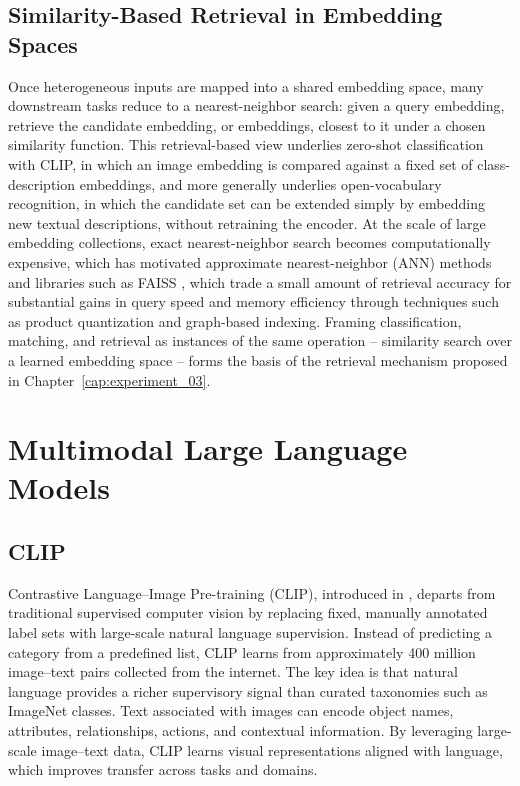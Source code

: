 \subsection{Similarity-Based Retrieval in Embedding Spaces}

Once heterogeneous inputs are mapped into a shared embedding space, many downstream tasks reduce to a nearest-neighbor search: given a query embedding, retrieve the candidate embedding, or embeddings, closest to it under a chosen similarity function. This retrieval-based view underlies zero-shot classification with CLIP, in which an image embedding is compared against a fixed set of class-description embeddings, and more generally underlies open-vocabulary recognition, in which the candidate set can be extended simply by embedding new textual descriptions, without retraining the encoder. At the scale of large embedding collections, exact nearest-neighbor search becomes computationally expensive, which has motivated approximate nearest-neighbor (ANN) methods and libraries such as FAISS \citep{johnson2019billion}, which trade a small amount of retrieval accuracy for substantial gains in query speed and memory efficiency through techniques such as product quantization and graph-based indexing. Framing classification, matching, and retrieval as instances of the same operation -- similarity search over a learned embedding space -- forms the basis of the retrieval mechanism proposed in Chapter~\ref{cap:experiment_03}.

\section{Multimodal Large Language Models}
\subsection{CLIP}

Contrastive Language–Image Pre-training (CLIP), introduced in \citep{radford2021learning}, departs from traditional supervised computer vision by replacing fixed, manually annotated label sets with large-scale natural language supervision. Instead of predicting a category from a predefined list, CLIP learns from approximately 400 million image–text pairs collected from the internet. The key idea is that natural language provides a richer supervisory signal than curated taxonomies such as ImageNet classes. Text associated with images can encode object names, attributes, relationships, actions, and contextual information. By leveraging large-scale image–text data, CLIP learns visual representations aligned with language, which improves transfer across tasks and domains.


